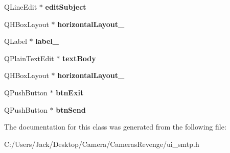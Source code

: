 \begin{DoxyCompactItemize}
\item 
\hypertarget{class_ui__smtp_add4f13458ddf86df39118ceefde93ac4}{Q\+Line\+Edit $\ast$ {\bfseries edit\+Subject}}\label{class_ui__smtp_add4f13458ddf86df39118ceefde93ac4}

\item 
\hypertarget{class_ui__smtp_a27242b607de7d601d0862a5936790d05}{Q\+H\+Box\+Layout $\ast$ {\bfseries horizontal\+Layout\+\_}}\label{class_ui__smtp_a27242b607de7d601d0862a5936790d05}

\item 
\hypertarget{class_ui__smtp_ab273083e481c293c963fe465fce62943}{Q\+Label $\ast$ {\bfseries label\+\_}}\label{class_ui__smtp_ab273083e481c293c963fe465fce62943}

\item 
\hypertarget{class_ui__smtp_a2cdf2b2d2ac7f2207a85387f58b94194}{Q\+Plain\+Text\+Edit $\ast$ {\bfseries text\+Body}}\label{class_ui__smtp_a2cdf2b2d2ac7f2207a85387f58b94194}

\item 
\hypertarget{class_ui__smtp_a815bbf358047e4c002e58fe56ce45252}{Q\+H\+Box\+Layout $\ast$ {\bfseries horizontal\+Layout\+\_}}\label{class_ui__smtp_a815bbf358047e4c002e58fe56ce45252}

\item 
\hypertarget{class_ui__smtp_abd0a2be46fa034e92a5fc7fd7f8eb20c}{Q\+Push\+Button $\ast$ {\bfseries btn\+Exit}}\label{class_ui__smtp_abd0a2be46fa034e92a5fc7fd7f8eb20c}

\item 
\hypertarget{class_ui__smtp_a90a3e2044479a37b38c3c6a40956a2cd}{Q\+Push\+Button $\ast$ {\bfseries btn\+Send}}\label{class_ui__smtp_a90a3e2044479a37b38c3c6a40956a2cd}

\end{DoxyCompactItemize}


The documentation for this class was generated from the following file\+:\begin{DoxyCompactItemize}
\item 
C\+:/\+Users/\+Jack/\+Desktop/\+Camera/\+Cameras\+Revenge/ui\+\_\+smtp.\+h\end{DoxyCompactItemize}
